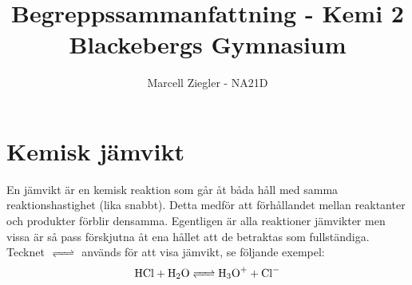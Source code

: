 \documentclass[12pt]{article}
\title{Begreppssammanfattning - Kemi 2 \\ Blackebergs Gymnasium}
\author{Marcell Ziegler - NA21D}
\begin{document}
    \begin{titlepage}
        \maketitle
    \end{titlepage}

    \tableofcontents

    \newpage

    \part{Kemisk jämvikt}
    
    En jämvikt är en kemisk reaktion som går åt båda håll med samma reaktionshastighet (lika snabbt). Detta medför att förhållandet mellan reaktanter och produkter förblir densamma. Egentligen är alla reaktioner jämvikter men vissa är så pass förskjutna åt ena hållet att de betraktas som fullständiga. Tecknet $\ce{<=>}$ används för att visa jämvikt, se följande exempel:
    \begin{equation*}
        \ce{HCl + H2O <=> H3O+ + Cl-}
    \end{equation*}

    
\end{document}
